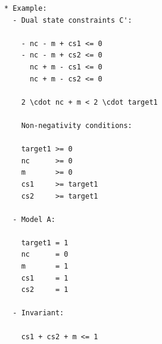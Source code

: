 \documentclass{article}
\begin{document}
\newpage
\begin{verbatim}
* Example:
  - Dual state constraints C':

    - nc - m + cs1 <= 0
    - nc - m + cs2 <= 0
      nc + m - cs1 <= 0
      nc + m - cs2 <= 0

    2 \cdot nc + m < 2 \cdot target1

    Non-negativity conditions:

    target1 >= 0
    nc      >= 0
    m       >= 0
    cs1     >= target1
    cs2     >= target1
  
  - Model A:

    target1 = 1
    nc      = 0
    m       = 1
    cs1     = 1
    cs2     = 1
    
  - Invariant:

    cs1 + cs2 + m <= 1

\end{verbatim}
\end{document}
